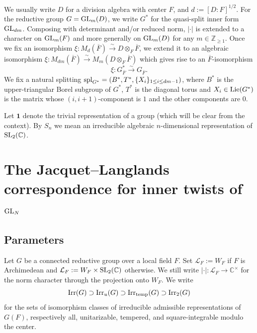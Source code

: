 \documentclass[11pt,reqno]{amsart}
\theoremstyle{plain}
\theoremstyle{definition}
\newcommand{\Z}{\mathbb{Z}}
\newcommand{\C}{\mathbb{C}}
\newcommand{\SL}{\tu{SL}}
\newcommand{\GL}{\tu{GL}}
\newcommand{\triv}{{\mathbf{1}}}
\newcommand{\Irr}{\tu{Irr}}
\newcommand{\tu}{\textup}
\numberwithin{equation}{subsection}
\begin{document}
We usually write $D$ for a division algebra with center $F$, and $d:=[D:F]^{1/2}$. For the reductive group $G=\GL_m(D)$, we write $G^*$ for the quasi-split inner form $\GL_{dm}$. 
Composing with determinant and/or reduced norm, $|\cdot|$ is extended to a character on $\GL_m(F)$ and more generally on $\GL_m(D)$ for any $m\in\Z_{\ge1}$. 
Once we fix an isomorphism $\xi \colon M_d(\overline{F}) \xrightarrow{\sim} D \otimes_{F} \overline{F}$, 
we extend it to an algebraic isomorphism 
$\xi \colon M_{dm}(\overline{F}) \xrightarrow{\sim} M_m(D \otimes_{F} \overline{F})$
which gives rise to an $\overline{F}$-isomorphism
\[
\xi \colon G^*_{\overline{F}}  \xrightarrow{\sim} G_{\overline{F}}.
\]
We fix a natural splitting $\tu{spl}_{G^*} = (B^*, T^*, \{X_i\}_{1 \leq i \leq dm-1})$, 
where
$B^*$ is the upper-triangular Borel subgroup of $G^*$, 
$T^*$ is the diagonal torus 
and $X_i \in \tu{Lie}(G^*)$ is the matrix whose $(i,i+1)$-component is $1$ and the other components are $0$.

Let $\triv$ denote the trivial representation of a group (which will be clear from the context). By $S_n$ we mean an irreducible algebraic $n$-dimensional representation of $\SL_2(\C)$.


\section{The Jacquet--Langlands correspondence for inner twists of $\GL_N$}\label{s:JL}

\subsection{Parameters}\label{ss:parameters}

Let $G$ be a connected reductive group over a local field $F$. Set $\mathcal L_F:=W_F$ if $F$ is Archimedean and $\mathcal L_F:=W_F\times \SL_2(\C)$ otherwise. We still write $|\cdot|\colon \mathcal L_F\to \C^\times$ for the norm character through the projection onto $W_F$.
We write 
\[
\Irr(G)\supset\Irr_u(G)\supset\Irr_{\tu{temp}}(G)\supset \Irr_2(G)
\]
for the sets of isomorphism classes of irreducible admissible representations of $G(F)$, respectively all, unitarizable, tempered, and square-integrable modulo the center. 
\end{document}
